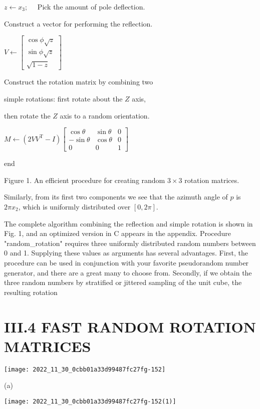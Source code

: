 $z \leftarrow x_{3} ; \quad$ Pick the amount of pole deflection.

Construct a vector for performing the reflection.

$V \leftarrow\left[\begin{array}{c}\cos \phi \sqrt{z} \\ \sin \phi \sqrt{z} \\ \sqrt{1-z}\end{array}\right]$

Construct the rotation matrix by combining two

simple rotations: first rotate about the $Z$ axis,

then rotate the $Z$ axis to a random orientation.

$M \leftarrow\left(2 V V^{\mathrm{T}}-I\right)\left[\begin{array}{ccc}\cos \theta & \sin \theta & 0 \\ -\sin \theta & \cos \theta & 0 \\ 0 & 0 & 1\end{array}\right]$

end

Figure 1. An efficient procedure for creating random $3 \times 3$ rotation matrices.

Similarly, from its first two components we see that the azimuth angle of $p$ is $2 \pi x_{2}$, which is uniformly distributed over $[0,2 \pi]$.

The complete algorithm combining the reflection and simple rotation is shown in Fig. 1, and an optimized version in C appears in the appendix. Procedure "random\_rotation" requires three uniformly distributed random numbers between 0 and 1. Supplying these values as arguments has several advantages. First, the procedure can be used in conjunction with your favorite pseudorandom number generator, and there are a great many to choose from. Secondly, if we obtain the three random numbers by stratified or jittered sampling of the unit cube, the resulting rotation

\section{III.4 FAST RANDOM ROTATION MATRICES}
\begin{center}
\texttt{[image: 2022\_11\_30\_0cbb01a33d99487fc27fg-152]}
\end{center}

(a)

\begin{center}
\texttt{[image: 2022\_11\_30\_0cbb01a33d99487fc27fg-152(1)]}
\end{center}

